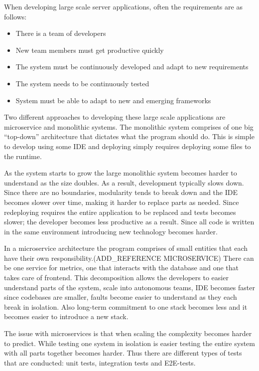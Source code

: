 When developing large scale server applications, often the requirements are as
follows:

\begin{itemize}
    \item There is a team of developers
    \item New team members must get productive quickly
    \item The system must be continuously developed and adapt to new
        requirements
    \item The system needs to be continuously tested
    \item System must be able to adapt to new and emerging frameworks
\end{itemize}

Two different approaches to developing these large scale applications are
microservice and monolithic systems. The monolithic system comprises of one big
``top-down'' architecture that dictates what the program should do. This is
simple to develop using some IDE and deploying simply requires deploying some
files to the runtime. 

As the system starts to grow the large monolithic system becomes harder to
understand as the size doubles. As a result, development typically slows down.
Since there are no boundaries, modularity tends to break down and the IDE
becomes slower over time, making it harder to replace parts as needed. Since
redeploying requires the entire application to be replaced and tests becomes
slower; the developer becomes less productive as a result. Since all code is
written in the same environment introducing new technology becomes harder.

In a microservice architecture the program comprises of small entities that
each have their own responsibility.(ADD\_REFERENCE MICROSERVICE) There can be
one service for metrics, one that interacts with the database and one that
takes care of frontend. This decomposition allows the developers to easier
understand parts of the system, scale into autonomous teams, IDE becomes faster
since codebases are smaller, faults become easier to understand as they each
break in isolation.  Also long-term commitment to one stack becomes less and it
becomes easier to introduce a new stack. 

The issue with microservices is that when scaling the complexity becomes harder
to predict. While testing one system in isolation is easier testing the entire
system with all parts together becomes harder. Thus there are different types of
tests that are conducted: unit tests, integration tests and E2E-tests.

